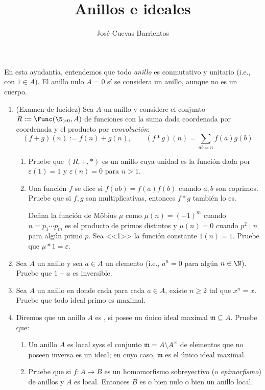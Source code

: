 \documentclass[11pt, reqno]{amsart}
\title{Anillos e ideales}
\date{\DTMdate{2025-04-24}}
\author{José Cuevas Barrientos}
\begin{document}
\maketitle

\nocite{lang:algebra}
\nocite{atiyah:commutative}

En esta ayudantía, entendemos que todo \emph{anillo} es conmutativo y unitario (i.e., con $1 \in A$).
El anillo nulo $A = 0$ sí se considera un anillo, aunque no es un cuerpo.

\begin{enumerate}
	\item (Examen de lucidez)
		Sea $A$ un anillo y considere el conjunto $R := \Func(\N_{>0}, A)$ de funciones con la suma dada coordenada por
		coordenada y el producto por \emph{convolución}:
		\[
			(f + g)(n) := f(n) + g(n), \qquad (f*g)(n) = \sum_{ab=n} f(a)g(b).
		\]
		\begin{enumerate}
			\item Pruebe que $(R, +, *)$ es un anillo cuya unidad es la función dada por
				$\varepsilon(1) = 1$ y $\varepsilon(n) = 0$ para $n > 1$.
			\item Una función $f$ se dice  si $f(ab) = f(a)f(b)$ cuando $a, b$ son
				coprimos.
				Pruebe que si $f, g$ son multiplicativas, entonces $f*g$ también lo es.

				\begin{prob}[fórmula de inversión de Möbius]
					\lookup
					Defina la función de Möbius $\mu$ como $\mu(n) = (-1)^m$ cuando $n = p_1 \cdots p_m$ es el
					producto de primos distintos y $\mu(n) = 0$ cuando $p^2 \mid n$ para algún primo $p$.
					Sea <<1>> la función constante $1(n) = 1$.
					Pruebe que $\mu * 1 = \varepsilon$.
				\end{prob}
		\end{enumerate}

	\item Sea $A$ un anillo y sea $a \in A$ un elemento  (i.e., $a^n = 0$ para algún $n \in \N$).
		Pruebe que $1 + a$ es inversible.

	\item Sea $A$ un anillo en donde cada para cada $a \in A$, existe $n \ge 2$ tal que $x^n = x$.
		Pruebe que todo ideal primo es maximal.

	\item\lookright
		Diremos que un anillo $A$ es , si posee un único ideal maximal $\mathfrak{m} \subseteq A$.
		Pruebe que:
		\begin{enumerate}
			\item Un anillo $A$ es local syss el conjunto $\mathfrak{m} = A \setminus A^\times$ de elementos
				que no poseen inversa es un ideal; en cuyo caso, $\mathfrak{m}$ es el único ideal
				maximal.
			\item Pruebe que si $f \colon A \to B$ es un homomorfismo sobreyectivo (o \emph{epimorfismo}) de
				anillos y $A$ es local. Entonces $B$ es o bien nulo o bien un anillo local.
		\end{enumerate}


\end{enumerate}
\end{document}
